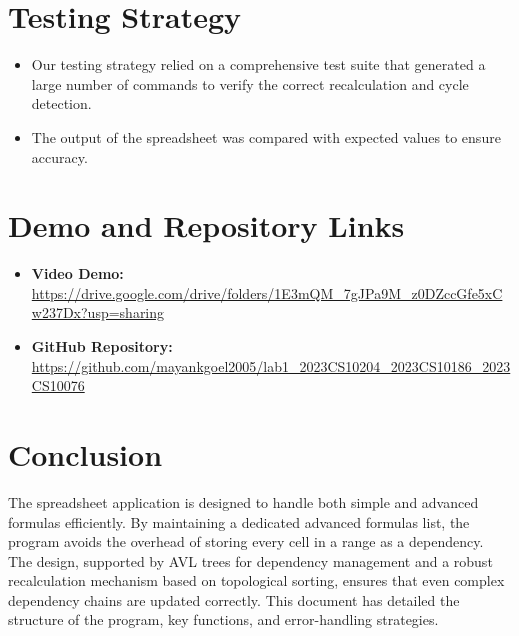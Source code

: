 \documentclass[12pt]{article}
\begin{document}
\section{Testing Strategy}
\begin{itemize}[noitemsep]
    \item Our testing strategy relied on a comprehensive test suite that generated a large number of commands to verify the correct recalculation and cycle detection.
    \item The output of the spreadsheet was compared with expected values to ensure accuracy.
\end{itemize}

\section{Demo and Repository Links}
\begin{itemize}[noitemsep]
    \item \textbf{Video Demo:} \url{https://drive.google.com/drive/folders/1E3mQM_7gJPa9M_z0DZccGfe5xCw237Dx?usp=sharing}
    \item \textbf{GitHub Repository:} \url{https://github.com/mayankgoel2005/lab1_2023CS10204_2023CS10186_2023CS10076}
\end{itemize}

\section{Conclusion}
The spreadsheet application is designed to handle both simple and advanced formulas efficiently. By maintaining a dedicated advanced formulas list, the program avoids the overhead of storing every cell in a range as a dependency. The design, supported by AVL trees for dependency management and a robust recalculation mechanism based on topological sorting, ensures that even complex dependency chains are updated correctly. This document has detailed the structure of the program, key functions, and error-handling strategies.
\end{document}
